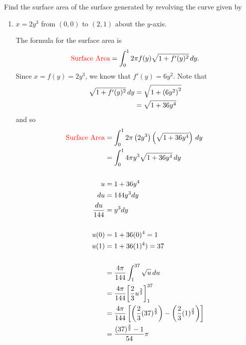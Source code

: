\documentclass[noinstructornotes]{ximera}
\begin{document}
\begin{problem}
Find the surface area of the surface generated by revolving the curve given by
	\begin{enumerate}
			\item  $x = 2y^3$ from $\left( 0, 0 \right)$ to $\left( 2, 1 \right)$ about the $y$-axis.
		\begin{freeResponse}
		The formula for the surface area is
			\[
			\text{{\color{red} Surface Area}} = \int_0^{1} 2 \pi f(y) \sqrt{1+f'(y)^2} \,d y.
			\]
		Since $x = f(y) = 2y^3$, 
		we know that $f'(y) = 6y^2$.  
		Note that
			\begin{align*}
			\sqrt{1+f'(y)^2} \,d y  &= \sqrt{1+ \left( 6y^2 \right)^2}  \\
			&=  \sqrt{1+ 36y^4}  \\
			\end{align*}
		and so
			\begin{align*}
			\text{{\color{red} Surface Area}} &= \int_0^{1} 2 \pi \left(2y^3\right) \left(  \sqrt{1+ 36y^4} \right) \,d y  \\
			&= \int_0^{1} 4 \pi y^3  \sqrt{1+ 36y^4}  \,d y \\
			& \\
			u&=1+ 36y^4 \\
			du &= 144y^3dy \\
			\frac{du}{144} &= y^3dy \\
			& \\
			u(0)&=1+36(0)^4 = 1\\
			u(1)&= 1+ 36(1)^4) = 37 \\
			& \\
			&= \frac{4 \pi}{144} \int_1^{37}  \sqrt{u}  \,d u \\
			&= \frac{4 \pi}{144} \bigg[ \frac{2}{3}u^{\frac{3}{2}} \bigg]_1^{37}\\
			&= \frac{4 \pi}{144} \left[ \left( \frac{2}{3}(37)^{\frac{3}{2}} \right) - \left( \frac{2}{3}(1)^{\frac{3}{2}} \right) \right]  \\
			&= \frac{(37)^{\frac{3}{2}} -1 }{54}\pi
			\end{align*}
	
		\end{freeResponse}
	

\end{enumerate}
\end{problem}
\end{document}
